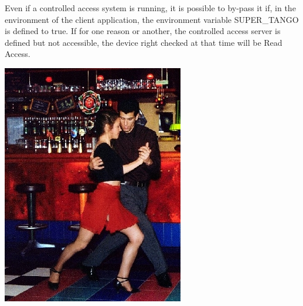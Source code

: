 Even if a controlled access system is running, it is possible to by-pass
it if, in the environment of the client application, the environment
variable SUPER\_TANGO is defined to \textquotedbl{}true\textquotedbl{}.
If for one reason or another, the controlled access server is defined
but not accessible, the device right checked at that time will be
Read Access.\vspace{1cm}


\begin{center}
\label{FourRicardo}\includegraphics[scale=4]{dance/AT97-65-size}
\par\end{center}
